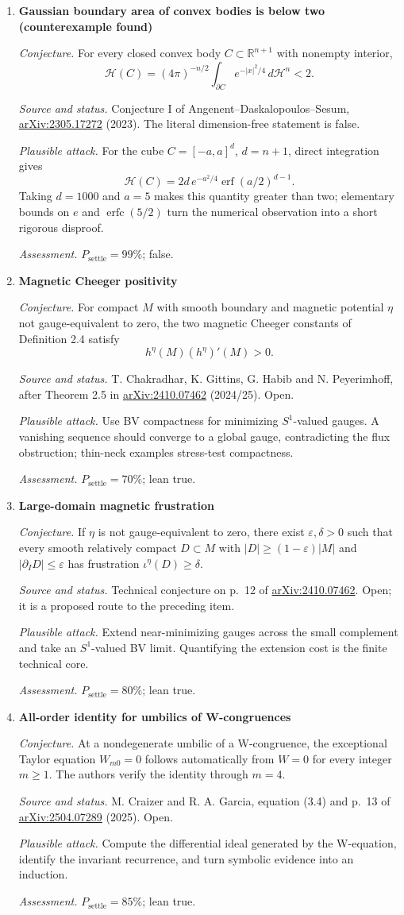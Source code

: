 \documentclass[11pt]{article}
\newcommand{\cand}[5]{%
  \item \textbf{#1}\par
  \emph{Conjecture.} #2\par
  \emph{Source and status.} #3\par
  \emph{Plausible attack.} #4\par
  \emph{Assessment.} #5
}
\newcommand{\psettle}{P_{\mathrm{settle}}}
\begin{document}
\begin{enumerate}[label=\textbf{L\arabic*.}]
\cand{Gaussian boundary area of convex bodies is below two (counterexample found)}
{For every closed convex body $C\subset\mathbb R^{n+1}$ with nonempty interior,
\[\mathcal H(C)=(4\pi)^{-n/2}\int_{\partial C}e^{-|x|^2/4}\,d\mathcal H^n<2.\]}
{Conjecture I of Angenent--Daskalopoulos--Sesum, \href{https://arxiv.org/abs/2305.17272}{arXiv:2305.17272} (2023).  The literal dimension-free statement is false.}
{For the cube $C=[-a,a]^d$, $d=n+1$, direct integration gives
\[\mathcal H(C)=2d\,e^{-a^2/4}\operatorname{erf}(a/2)^{d-1}.\]
Taking $d=1000$ and $a=5$ makes this quantity greater than two; elementary bounds on $e$ and $\operatorname{erfc}(5/2)$ turn the numerical observation into a short rigorous disproof.}
{$\psettle=99\%$; false.}

\cand{Magnetic Cheeger positivity}
{For compact $M$ with smooth boundary and magnetic potential $\eta$ not gauge-equivalent to zero, the two magnetic Cheeger constants of Definition 2.4 satisfy
\[h^\eta(M)(h^\eta)'(M)>0.\]}
{T. Chakradhar, K. Gittins, G. Habib and N. Peyerimhoff, after Theorem 2.5 in \href{https://arxiv.org/abs/2410.07462}{arXiv:2410.07462} (2024/25).  Open.}
{Use BV compactness for minimizing $S^1$-valued gauges.  A vanishing sequence should converge to a global gauge, contradicting the flux obstruction; thin-neck examples stress-test compactness.}
{$\psettle=70\%$; lean true.}

\cand{Large-domain magnetic frustration}
{If $\eta$ is not gauge-equivalent to zero, there exist $\varepsilon,\delta>0$ such that every smooth relatively compact $D\subset M$ with $|D|\ge(1-\varepsilon)|M|$ and $|\partial_I D|\le\varepsilon$ has frustration $\iota^\eta(D)\ge\delta$.}
{Technical conjecture on p.~12 of \href{https://arxiv.org/abs/2410.07462}{arXiv:2410.07462}.  Open; it is a proposed route to the preceding item.}
{Extend near-minimizing gauges across the small complement and take an $S^1$-valued BV limit.  Quantifying the extension cost is the finite technical core.}
{$\psettle=80\%$; lean true.}

\cand{All-order identity for umbilics of W-congruences}
{At a nondegenerate umbilic of a W-congruence, the exceptional Taylor equation $W_{m0}=0$ follows automatically from $W=0$ for every integer $m\ge1$.  The authors verify the identity through $m=4$.}
{M. Craizer and R. A. Garcia, equation (3.4) and p.~13 of \href{https://arxiv.org/abs/2504.07289}{arXiv:2504.07289} (2025).  Open.}
{Compute the differential ideal generated by the W-equation, identify the invariant recurrence, and turn symbolic evidence into an induction.}
{$\psettle=85\%$; lean true.}


\end{enumerate}
\end{document}
